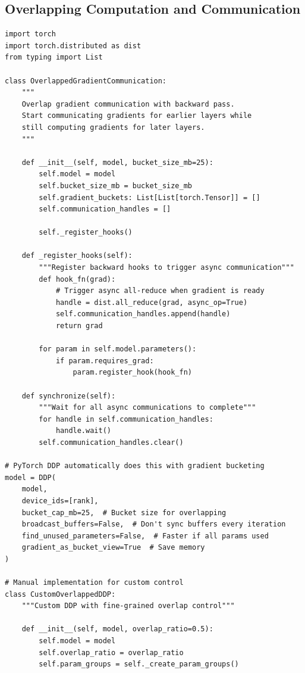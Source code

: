 \subsection{Overlapping Computation and Communication}

\begin{lstlisting}[style=python, caption=Overlap communication with computation]
import torch
import torch.distributed as dist
from typing import List

class OverlappedGradientCommunication:
    """
    Overlap gradient communication with backward pass.
    Start communicating gradients for earlier layers while
    still computing gradients for later layers.
    """

    def __init__(self, model, bucket_size_mb=25):
        self.model = model
        self.bucket_size_mb = bucket_size_mb
        self.gradient_buckets: List[List[torch.Tensor]] = []
        self.communication_handles = []

        self._register_hooks()

    def _register_hooks(self):
        """Register backward hooks to trigger async communication"""
        def hook_fn(grad):
            # Trigger async all-reduce when gradient is ready
            handle = dist.all_reduce(grad, async_op=True)
            self.communication_handles.append(handle)
            return grad

        for param in self.model.parameters():
            if param.requires_grad:
                param.register_hook(hook_fn)

    def synchronize(self):
        """Wait for all async communications to complete"""
        for handle in self.communication_handles:
            handle.wait()
        self.communication_handles.clear()

# PyTorch DDP automatically does this with gradient bucketing
model = DDP(
    model,
    device_ids=[rank],
    bucket_cap_mb=25,  # Bucket size for overlapping
    broadcast_buffers=False,  # Don't sync buffers every iteration
    find_unused_parameters=False,  # Faster if all params used
    gradient_as_bucket_view=True  # Save memory
)

# Manual implementation for custom control
class CustomOverlappedDDP:
    """Custom DDP with fine-grained overlap control"""

    def __init__(self, model, overlap_ratio=0.5):
        self.model = model
        self.overlap_ratio = overlap_ratio
        self.param_groups = self._create_param_groups()


\end{lstlisting}
